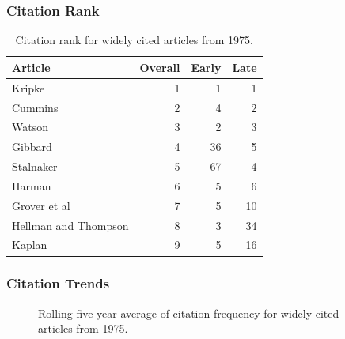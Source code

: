 \documentclass[
  10pt,
  letterpaper,
  DIV=11,
  numbers=noendperiod,
  twoside]{scrartcl}
\begin{document}
\subsubsection*{Citation Rank}\label{sec-rank-1975}

\begin{longtable}[]{@{}lrrr@{}}

\caption{\label{tbl-citation-rank-1975}Citation rank for widely cited
articles from 1975.}

\tabularnewline

\toprule\noalign{}
Article & Overall & Early & Late \\
\midrule\noalign{}
\endhead
\bottomrule\noalign{}
\endlastfoot
Kripke & 1 & 1 & 1 \\
Cummins & 2 & 4 & 2 \\
Watson & 3 & 2 & 3 \\
Gibbard & 4 & 36 & 5 \\
Stalnaker & 5 & 67 & 4 \\
Harman & 6 & 5 & 6 \\
Grover et al & 7 & 5 & 10 \\
Hellman and Thompson & 8 & 3 & 34 \\
Kaplan & 9 & 5 & 16 \\

\end{longtable}

\subsubsection*{Citation Trends}\label{sec-trends-1975}

\begin{figure}


\caption{\label{fig-citation-spaghetti-1975}Rolling five year average of
citation frequency for widely cited articles from 1975.}

\end{figure}%
\end{document}
